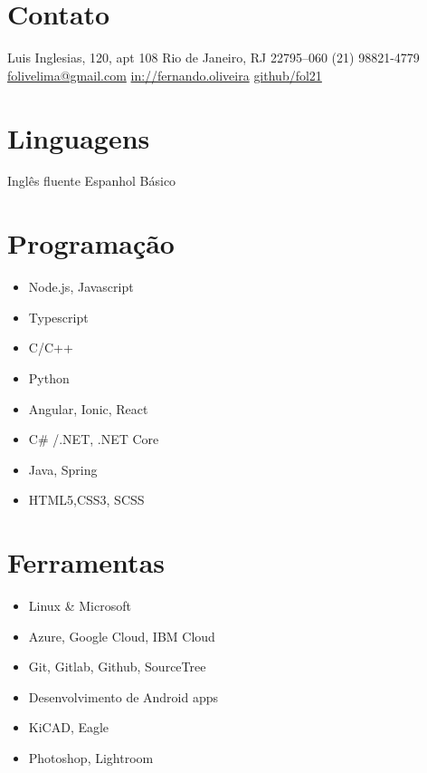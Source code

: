 \documentclass[]{friggeri-cv} %
\begin{document}


\vspace{0.5cm}

 
\begin{aside} %

\section{Contato}
Luis Inglesias, 120, apt 108
Rio de Janeiro, RJ
22795--060
(21) 98821-4779
\href{mailto:folivelima@gmail.com}{folivelima@gmail.com}
\href{https://www.linkedin.com/in/fernando-lima-47673263/}{in://fernando.oliveira}
\href{https://github.com/fol21}{github/fol21}

\section{Linguagens}
Inglês fluente
Espanhol Básico
\section{Programação}
\begin{itemize}
\item Node.js, Javascript
\item Typescript
\item C/C++
\item Python
\item Angular, Ionic, React
\item C\# /.NET, .NET Core
\item Java, Spring
\item HTML5,CSS3, SCSS
\end{itemize}

\section{Ferramentas}
\begin{itemize}
\item Linux \& Microsoft
\item Azure, Google Cloud, IBM Cloud
\item Git, Gitlab, Github, SourceTree
\item Desenvolvimento de Android apps
\item KiCAD, Eagle
\item Photoshop, Lightroom
\end{itemize}

\end{aside}
\end{document}
